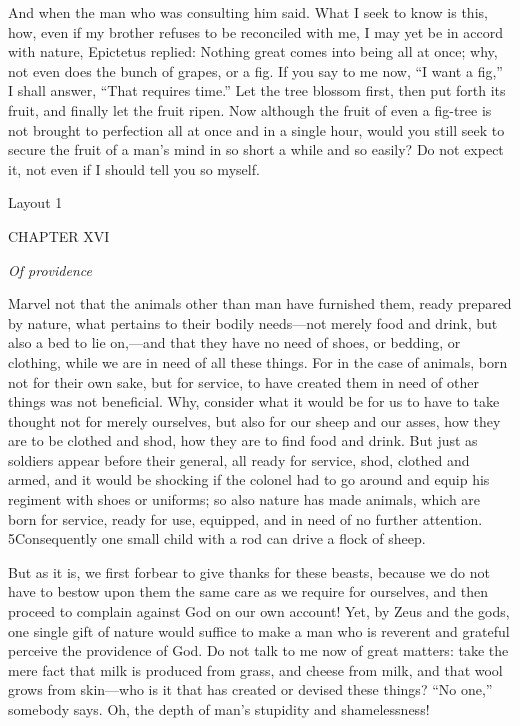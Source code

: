 And when the man who was consulting him said. What I seek to know is this, how, even if my brother refuses to be reconciled with me, I may yet be in accord with nature, Epictetus replied: Nothing great comes into being all at once; why, not even does the bunch of grapes, or a fig. If you say to me now, ``I want a fig,'' I shall answer, ``That requires time.'' Let the tree blossom first, then put forth its fruit, and finally let the fruit ripen. Now although the fruit of even a fig-tree is not brought to perfection all at once and in a single hour, would you still seek to secure the fruit of a man's mind in so short a while and so easily? Do not expect it, not even if I should tell you so myself.



Layout 1

CHAPTER XVI

\emph{Of providence}

Marvel not that the animals other than man have furnished them, ready prepared by nature, what pertains to their bodily needs—not merely food and drink, but also a bed to lie on,—and that they have no need of shoes, or bedding, or clothing, while we are in need of all these things. For in the case of animals, born not for their own sake, but for service, to have created them in need of other things was not beneficial. Why, consider what it would be for us to have to take thought not for merely ourselves, but also for our sheep and our asses, how they are to be clothed and shod, how they are to find food and drink. But just as soldiers appear before their general, all ready for service, shod, clothed and armed, and it would be shocking if the colonel had to go around and equip his regiment with shoes or uniforms; so also nature has made animals, which are born for service, ready for use, equipped, and in need of no further attention. 5Consequently one small child with a rod can drive a flock of sheep.

But as it is, we first forbear to give thanks for these beasts, because we do not have to bestow upon them the same care as we require for ourselves, and then proceed to complain against God on our own account! Yet, by Zeus and the gods, one single gift of nature would suffice to make a man who is reverent and grateful perceive the providence of God. Do not talk to me now of great matters: take the mere fact that milk is produced from grass, and cheese from milk, and that wool grows from skin—who is it that has created or devised these things? ``No one,'' somebody says. Oh, the depth of man's stupidity and shamelessness!


